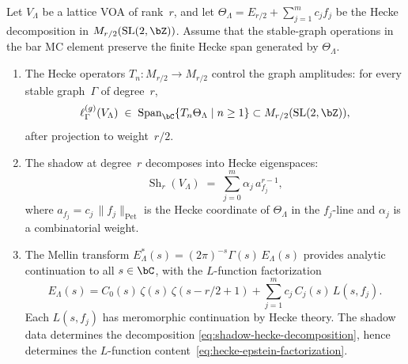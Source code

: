 \begin{theorem}
\label{thm:spectral-continuation-bridge}
\ClaimStatusProvedHere
Let $V_\Lambda$ be a lattice VOA of rank~$r$, and let
$\Theta_\Lambda = E_{r/2} + \sum_{j=1}^m c_j f_j$ be the
Hecke decomposition in $M_{r/2}(\mathrm{SL}(2,\bZ))$.
Assume that the stable-graph operations in the bar MC element
preserve the finite Hecke span generated by $\Theta_\Lambda$.
\begin{enumerate}[label=\textup{(\roman*)}]
\item The Hecke operators $T_n \colon M_{r/2} \to M_{r/2}$ control
 the graph amplitudes: for every stable graph~$\Gamma$ of degree~$r$,
 \begin{equation}\label{eq:hecke-equivariance}
 \ell_\Gamma^{(g)}(V_\Lambda)
 \;\in\;
 \mathrm{Span}_{\bC}\{T_n\Theta_\Lambda \mid n \geq 1\}
 \subset M_{r/2}(\mathrm{SL}(2,\bZ)),
 \end{equation}
 after projection to weight~$r/2$.

\item The shadow at degree~$r$ decomposes into Hecke eigenspaces:
 \begin{equation}\label{eq:shadow-hecke-decomposition}
 \operatorname{Sh}_r(V_\Lambda)
 \;=\;
 \sum_{j=0}^{m} \alpha_j\,a_{f_j}^{r-1},
 \end{equation}
 where $a_{f_j} = c_j\,\lVert f_j\rVert_{\mathrm{Pet}}$ is the
 Hecke coordinate of $\Theta_\Lambda$ in the $f_j$-line and
 $\alpha_j$ is a combinatorial weight.

\item The Mellin transform
 $E^*_\Lambda(s) = (2\pi)^{-s}\Gamma(s)\,E_\Lambda(s)$ provides
 analytic continuation to all $s \in \bC$, with the
 $L$-function factorization
 \begin{equation}\label{eq:hecke-epstein-factorization}
 E_\Lambda(s)
 = C_0(s)\,\zeta(s)\,\zeta(s{-}r/2{+}1)
 + \sum_{j=1}^m c_j\,C_j(s)\,L(s,f_j).
 \end{equation}
 Each $L(s,f_j)$ has meromorphic continuation by Hecke theory.
 The shadow data determines the decomposition
 \eqref{eq:shadow-hecke-decomposition}, hence determines the
 $L$-function content~\eqref{eq:hecke-epstein-factorization}.
\end{enumerate}
\end{theorem}

